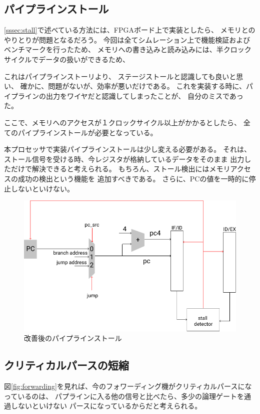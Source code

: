 \documentclass[../main.tex]{subfiles}
\begin{document}
    \subsection{パイプラインストール} \label{ssec:stallImprove}

        \ref{sssec:stall}で述べている方法には、FPGAボード上で実装としたら、
        メモリとのやりとりが問題となるだろう。
        今回は全てシムレーション上で機能検証およびベンチマークを行ったため、
        メモリへの書き込みと読み込みには、半クロックサイクルでデータの扱いができるため、

        これはパイプラインストーリより、
        ステージストールと認識しても良いと思い、
        確かに、問題がないが、効率が悪いだけである。
        これを実装する時に、パイプラインの出力をワイヤだと認識してしまったことが、
        自分のミスであった。

        ここで、メモリへのアクセスが１クロックサイクル以上がかかるとしたら、
        全てのパイプラインストールが必要となっている。

        本プロセッサで実装パイプラインストールは少し変える必要がある。
        それは、ストール信号を受ける時、今レジスタが格納しているデータをそのまま
        出力しただけで解決できると考えられる。
        もちろん、ストール検出にはメモリアクセスの成功の検出という機能を
        追加すべきである。
        さらに、PCの値を一時的に停止しないといけない。

        \begin{figure}[h]
            \centering
            \includegraphics[width = 1.3\columnwidth]{../images/stall_improve.png}
            \caption{改善後のパイプラインストール}
            \label{fig:stallImprove}
        \end{figure}

    \subsection{クリティカルパースの短縮} \label{ssec:forwardingImprove}
        図\ref{fig:forwarding}を見れば、今のフォワーディング機がクリティカルパースになっているのは、
        パプラインに入る他の信号と比べたら、多少の論理ゲートを通過しないといけない
        パースになっているからだと考えられる。
\end{document}
